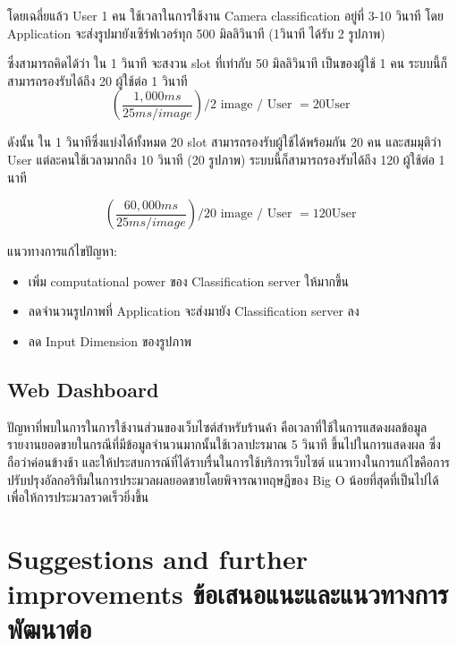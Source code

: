 โดยเฉลี่ยแล้ว User 1 คน ใช้เวลาในการใช้งาน Camera classification อยู่ที่ 3-10 วินาที
โดย Application จะส่งรูปมายังเซิร์ฟเวอร์ทุก 500 มิลลิวินาที (1วินาที ได้รับ 2 รูปภาพ)

ซึ่งสามารถคิดได้ว่า ใน 1 วินาที จะสงวน slot ที่เท่ากับ 50 มิลลิวินาที เป็นของผู้ใช้ 1 คน
ระบบนี้ก็สามารถรองรับได้ถึง 20 ผู้ใช้ต่อ 1 วินาที
\begin{equation}
    ({\frac {1,000 ms}{25 ms / image}} )  / 2 \text{ image / User }  = 20 \text{User }
\end{equation}

ดังนั้น ใน 1 วินาทีซึ่งแบ่งได้ทั้งหมด 20  slot สามารถรองรับผู้ใช้ได้พร้อมกัน 20 คน
และสมมุติว่า User แต่ละคนใช้เวลามากถึง 10 วินาที (20 รูปภาพ) ระบบนี้ก็สามารถรองรับได้ถึง 120 ผู้ใช้ต่อ 1 นาที

\begin{equation}
    ({\frac {60,000 ms}{25 ms / image}} )   / 20 \text{ image / User }  = 120 \text{User }
\end{equation}

แนวทางการแก้ไขปัญหา:

\begin{itemize}
    \item เพิ่ม computational power ของ Classification server ให้มากขึ้น
    \item ลดจำนวนรูปภาพที่ Application จะส่งมายัง Classification server ลง
    \item ลด Input Dimension ของรูปภาพ
\end{itemize}

\subsection{Web Dashboard}
ปัญหาที่พบในการในการใช้งานส่วนของเว็บไซต์สำหรับร้านค้า คือเวลาที่ใช้ในการแสดงผลข้อมูลรายงานยอดขายในกรณีที่มีข้อมูลจำนวนมากนั้นใช้เวลาปะรมาณ 5 วินาที
ขึ้นไปในการแสดงผล ซึ่งถือว่าค่อนข้างช้า และให้ประสบการณ์ที่ได้ราบรื่นในการใช้บริการเว็บไซต์ แนวทางในการแก้ไขคือการปรับปรุงอัลกอริทึมในการประมวลผลยอดขายโดยพิจารณาทฤษฎีของ
Big O น้อยที่สุดที่เป็นไปได้ เพื่อให้การประมวลรวดเร็วยิ่งขึ้น



\section{\ifenglish%
      Suggestions and further improvements
  \else%
      ข้อเสนอแนะและแนวทางการพัฒนาต่อ
  \fi
 }


